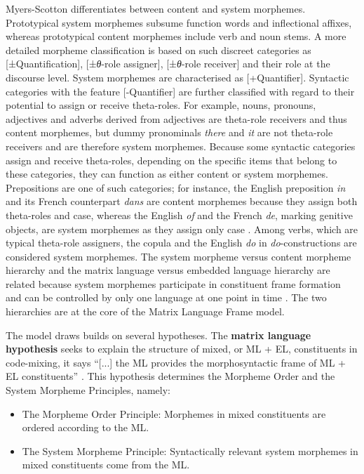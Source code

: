 Myers-Scotton differentiates between content and system morphemes. Prototypical system morphemes subsume function words and inflectional affixes, whereas prototypical content morphemes include verb and noun stems. A more detailed morpheme classification is based on such discreet categories as [±Quantification], [±\textit{θ}-role assigner], [±\textit{θ}-role receiver] and their role at the discourse level. System morphemes are characterised as [+Quantifier]. Syntactic categories with the feature [-Quantifier] are further classified with regard to their potential to assign or receive theta-roles. For example, nouns, pronouns, adjectives and adverbs derived from adjectives are theta-role receivers and thus content morphemes, but dummy pronominals \textit{there} and \textit{it} are not theta-role receivers and are therefore system morphemes. Because some syntactic categories assign and receive theta-roles, depending on the specific items that belong to these categories, they can function as either content or system morphemes. Prepositions are one of such categories; for instance, the English preposition \textit{in} and its French counterpart \textit{dans} are content morphemes because they assign both theta-roles and case, whereas the English \textit{of} and the French \textit{de}, marking genitive objects, are system morphemes as they assign only case \citep[cf.][98--102]{myers-scotton-duelling-1993}. Among verbs, which are typical theta-role assigners, the copula and the English \textit{do} in \textit{do}-constructions are considered system morphemes. The system morpheme versus content morpheme hierarchy and the matrix language versus embedded language hierarchy are related because system morphemes participate in constituent frame formation and can be controlled by only one language at one point in time \citep[235]{milroy-lexically-1995}. The two hierarchies are at the core of the Matrix Language Frame model.


The model draws builds on several hypotheses. The \textbf{matrix language hypothesis} seeks to explain the structure of mixed, or ML + EL,  constituents in code-mixing, it says ``[...] the ML provides the morphosyntactic frame of ML + EL constituents'' \citep[82]{myers-scotton-duelling-1993}. This hypothesis determines the Morpheme Order and the System Morpheme Principles, namely:
\begin{itemize}
\item The Morpheme Order Principle: Morphemes in mixed constituents are ordered according to the ML. 
\item The System Morpheme Principle: Syntactically relevant system morphemes in mixed constituents come from the ML. \citep[cf.][239]{milroy-lexically-1995} 
\end{itemize}

